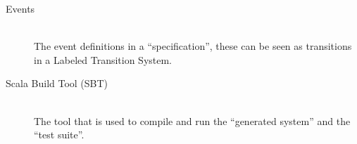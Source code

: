 \begin{description}
\item[Events]\hfill\\
The event definitions in a ``specification'', these can be seen as transitions
in a Labeled Transition System.

\item[Scala Build Tool (SBT)]\hfill\\
The tool that is used to compile and run the ``generated system'' and the
``test suite''.

\end{description}
